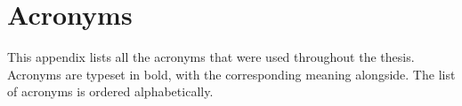 \chapter{Acronyms}
\label{app:acronyms}

This appendix lists all the acronyms that were used throughout the thesis. Acronyms are typeset in bold, with the corresponding meaning alongside. The list of acronyms is ordered alphabetically.
\printacronyms[heading=none]
